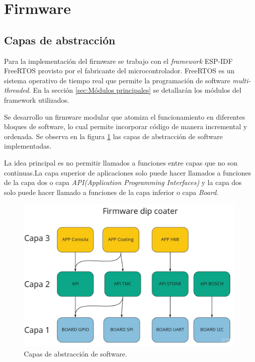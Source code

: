
\section{Firmware}
\subsection{Capas de abstracción}

Para la implementación del firmware se trabajo con el \textit{framework} ESP-IDF FreeRTOS \citep{web_esp_idf} provisto por el fabricante del microcontrolador. FreeRTOS es un sistema operativo de tiempo real que permite la programación de software \textit{multi-threaded}. En la sección \ref{sec:Módulos principales} se detallarán los módulos del framework utilizados. 

Se desarrollo un firmware modular que atomiza el funcionamiento en diferentes bloques de software, lo cual permite incorporar código de manera incremental y ordenada. Se observa en la figura \ref{fig:capas} las capas de abstracción de software implementadas.

La idea principal es no permitir llamados a funciones entre capas que no son continuas.La capa superior de aplicaciones solo puede hacer llamados a funciones de la capa dos o capa \textit{API(Application Programming Interfaces)} y la capa dos solo puede hacer llamado a funciones de la capa inferior o capa \textit{Board}.


\begin{figure}[h]
	\centering
	\includegraphics[width=1\textwidth]{./Figures/capas.jpg}
	\caption{Capas de abstracción de software.}
	\label{fig:capas}
\end{figure}

